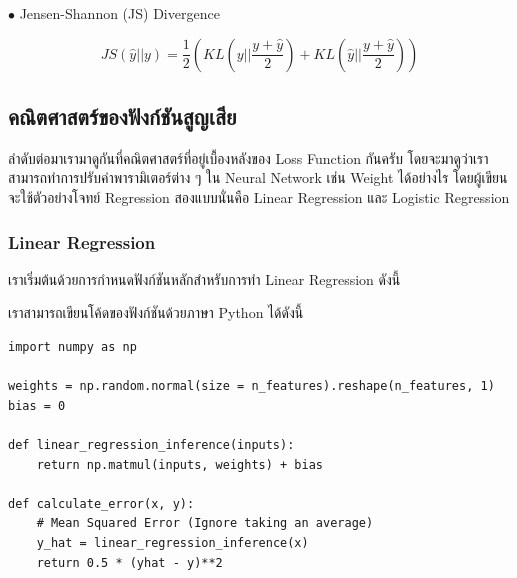 \noindent $\bullet$ Jensen-Shannon (JS) Divergence

\begin{equation}\label{eq:jensen_shannon_diver}
    JS(\hat{y} || y) = \frac{1}{2} \left ( KL \left ( y||\frac{y+\hat{y}}{2} \right ) +
    KL \left ( \hat{y}||\frac{y+\hat{y}}{2} \right ) \right )
\end{equation}

\subsection{คณิตศาสตร์ของฟังก์ชันสูญเสีย}

ลำดับต่อมาเรามาดูกันที่คณิตศาสตร์ที่อยู่เบื้องหลังของ Loss Function กันครับ โดยจะมาดูว่าเราสามารถทำการปรับค่าพารามิเตอร์ต่าง ๆ ใน Neural
Network เช่น Weight ได้อย่างไร โดยผู้เขียนจะใช้ตัวอย่างโจทย์ Regression สองแบบนั่นคือ Linear Regression และ Logistic Regression

\subsubsection{Linear Regression}

เราเริ่มต้นด้วยการกำหนดฟังก์ชันหลักสำหรับการทำ Linear Regression ดังนี้


เราสามารถเขียนโค้ดของฟังก์ชันด้วยภาษา Python ได้ดังนี้

\begin{lstlisting}[style=MyPython]
import numpy as np

weights = np.random.normal(size = n_features).reshape(n_features, 1)
bias = 0

def linear_regression_inference(inputs):
    return np.matmul(inputs, weights) + bias   

def calculate_error(x, y):
    # Mean Squared Error (Ignore taking an average)
    y_hat = linear_regression_inference(x)
    return 0.5 * (yhat - y)**2 
\end{lstlisting}

